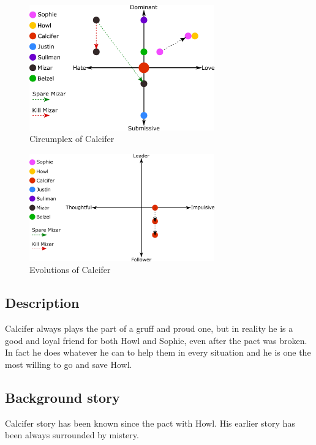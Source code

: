 \begin{figure}
  \centering
  \includegraphics[width=8cm]{Images/Circumplexes/calciferCircumplex}
  \caption{Circumplex of Calcifer}
\end{figure}

\begin{figure}
  \centering
   \includegraphics[width=8cm]{Images/Evolutions/calciferEvolution}
  \caption{Evolutions of Calcifer}
\end{figure}

\subsection{Description}
Calcifer always plays the part of a gruff and proud one, but in reality he is a good and loyal friend for both Howl and Sophie, even after the pact was broken. In fact he does whatever he can to help them in every situation and he is one the most willing to go and save Howl.

\subsection{Background story}
Calcifer story has been known since the pact with Howl. His earlier story has been always surrounded by mistery.

